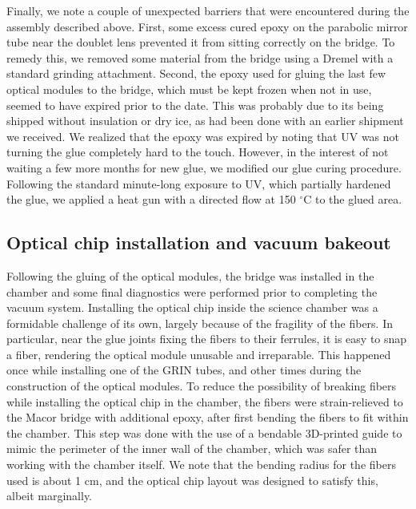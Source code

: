 Finally, we note a couple of unexpected barriers that were encountered during the assembly described above. First, some excess cured epoxy on the parabolic mirror tube near the doublet lens prevented it from sitting correctly on the bridge. To remedy this, we removed some material from the bridge using a Dremel with a standard grinding attachment. Second, the epoxy used for gluing the last few optical modules to the bridge, which must be kept frozen when not in use, seemed to have expired prior to the date. This was probably due to its being shipped without insulation or dry ice, as had been done with an earlier shipment we received. We realized that the epoxy was expired by noting that UV was not turning the glue completely hard to the touch. However, in the interest of not waiting a few more months for new glue, we modified our glue curing procedure. Following the standard minute-long exposure to UV, which partially hardened the glue, we applied a heat gun with a directed flow at 150 $^{\circ}$C to the glued area. 

\subsection{Optical chip installation and vacuum bakeout}
Following the gluing of the optical modules, the bridge was installed in the chamber and some final diagnostics were performed prior to completing the vacuum system. Installing the optical chip inside the science chamber was a formidable challenge of its own, largely because of the fragility of the fibers. In particular, near the glue joints fixing the fibers to their ferrules, it is easy to snap a fiber, rendering the optical module unusable and irreparable. This happened once while installing one of the GRIN tubes, and other times during the construction of the optical modules. To reduce the possibility of breaking fibers while installing the optical chip in the chamber, the fibers were strain-relieved to the Macor bridge with additional epoxy, after first bending the fibers to fit within the chamber. This step was done with the use of a bendable 3D-printed guide to mimic the perimeter of the inner wall of the chamber, which was safer than working with the chamber itself. We note that the bending radius for the fibers used is about 1 cm, and the optical chip layout was designed to satisfy this, albeit marginally. 

